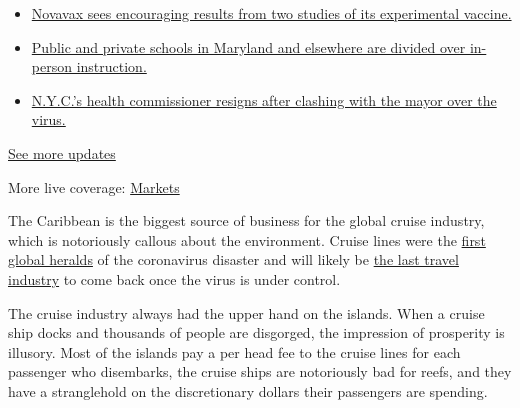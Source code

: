 \begin{itemize}
\tightlist
\item
  \href{https://www.nytimes3xbfgragh.onion/2020/08/04/world/coronavirus-cases.html?action=click\&pgtype=Article\&state=default\&region=MAIN_CONTENT_1\&context=storylines_live_updates\#link-1228a480}{Novavax
  sees encouraging results from two studies of its experimental
  vaccine.}
\item
  \href{https://www.nytimes3xbfgragh.onion/2020/08/04/world/coronavirus-cases.html?action=click\&pgtype=Article\&state=default\&region=MAIN_CONTENT_1\&context=storylines_live_updates\#link-4825b93}{Public
  and private schools in Maryland and elsewhere are divided over
  in-person instruction.}
\item
  \href{https://www.nytimes3xbfgragh.onion/2020/08/04/world/coronavirus-cases.html?action=click\&pgtype=Article\&state=default\&region=MAIN_CONTENT_1\&context=storylines_live_updates\#link-4d1eafa8}{N.Y.C.'s
  health commissioner resigns after clashing with the mayor over the
  virus.}
\end{itemize}

\href{https://www.nytimes3xbfgragh.onion/2020/08/04/world/coronavirus-cases.html?action=click\&pgtype=Article\&state=default\&region=MAIN_CONTENT_1\&context=storylines_live_updates}{See
more updates}

More live coverage:
\href{https://www.nytimes3xbfgragh.onion/live/2020/08/04/business/stock-market-today-coronavirus?action=click\&pgtype=Article\&state=default\&region=MAIN_CONTENT_1\&context=storylines_live_updates}{Markets}

The Caribbean is the biggest source of business for the global cruise
industry, which is notoriously callous about the environment. Cruise
lines were the
\href{https://www.nytimes3xbfgragh.onion/2020/03/19/travel/coronavirus-cruise-costa-luminosa.html}{first
global heralds} of the coronavirus disaster and will likely be
\href{https://www.nytimes3xbfgragh.onion/2020/06/26/travel/coronavirus-cruises-reopening.html}{the
last travel industry} to come back once the virus is under control.

The cruise industry always had the upper hand on the islands. When a
cruise ship docks and thousands of people are disgorged, the impression
of prosperity is illusory. Most of the islands pay a per head fee to the
cruise lines for each passenger who disembarks, the cruise ships are
notoriously bad for reefs, and they have a stranglehold on the
discretionary dollars their passengers are spending.

